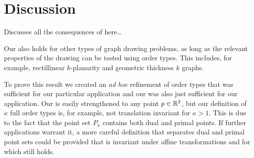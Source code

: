 \documentclass{patmorin}
\begin{document}
\section{Discussion}

Discusses all the consequences of  here\ldots

Our  also holds for other types of graph drawing problems,
as long as the relevant properties of the drawing can be tested using
order types.  This includes, for example, rectillinear $k$-planarity
and geometric thickness $k$ graphs.

To prove this result we created an \emph{ad hoc} refinement of order types
that was sufficient for our particular application and our 
was also just sufficient for our application.  Our  is easily
strengthened to any point $p\in\mathbb{R}^2$, but our definition of $\kappa$
full order types is, for example, not translation invariant for $\kappa
> 1$. This is due to the fact that the point set $P_{\kappa}$ contains
both dual and primal points.  If further applications warrant it, a more
careful definition that separates dual and primal point sets could be
provided that is invariant under affine transformations and for which
 still holds.
\end{document}
